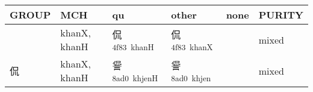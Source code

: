 \documentclass[14pt,a4paper]{scrartcl}
\begin{document}
\begin{longtable}[c]{@{}llllll@{}}
\toprule
\begin{minipage}[b]{0.14\columnwidth}\raggedright\strut
GROUP
\strut\end{minipage} &
\begin{minipage}[b]{0.14\columnwidth}\raggedright\strut
MCH
\strut\end{minipage} &
\begin{minipage}[b]{0.14\columnwidth}\raggedright\strut
qu
\strut\end{minipage} &
\begin{minipage}[b]{0.14\columnwidth}\raggedright\strut
other
\strut\end{minipage} &
\begin{minipage}[b]{0.14\columnwidth}\raggedright\strut
none
\strut\end{minipage} &
\begin{minipage}[b]{0.14\columnwidth}\raggedright\strut
PURITY
\strut\end{minipage}\tabularnewline
\midrule
\endhead
\begin{minipage}[t]{0.14\columnwidth}\raggedright\strut
𠈉
\strut\end{minipage} &
\begin{minipage}[t]{0.14\columnwidth}\raggedright\strut
khanX, khanH
\strut\end{minipage} &
\begin{minipage}[t]{0.14\columnwidth}\raggedright\strut
侃\textsuperscript{4f83~khanH}
\strut\end{minipage} &
\begin{minipage}[t]{0.14\columnwidth}\raggedright\strut
侃\textsuperscript{4f83~khanX}
\strut\end{minipage} &
\begin{minipage}[t]{0.14\columnwidth}\raggedright\strut
\strut\end{minipage} &
\begin{minipage}[t]{0.14\columnwidth}\raggedright\strut
mixed
\strut\end{minipage}\tabularnewline
\begin{minipage}[t]{0.14\columnwidth}\raggedright\strut
侃
\strut\end{minipage} &
\begin{minipage}[t]{0.14\columnwidth}\raggedright\strut
khanX, khanH
\strut\end{minipage} &
\begin{minipage}[t]{0.14\columnwidth}\raggedright\strut
諐\textsuperscript{8ad0~khjenH}
\strut\end{minipage} &
\begin{minipage}[t]{0.14\columnwidth}\raggedright\strut
諐\textsuperscript{8ad0~khjen}
\strut\end{minipage} &
\begin{minipage}[t]{0.14\columnwidth}\raggedright\strut
\strut\end{minipage} &
\begin{minipage}[t]{0.14\columnwidth}\raggedright\strut
mixed
\strut\end{minipage}\tabularnewline
\bottomrule
\end{longtable}
\end{document}
